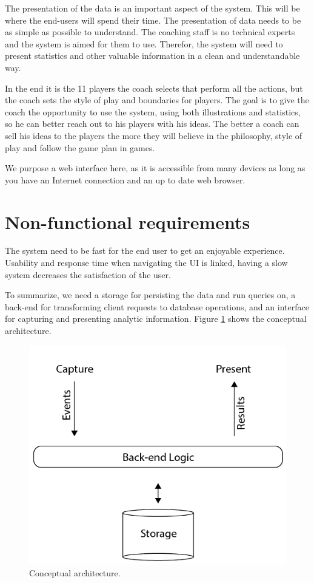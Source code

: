 The presentation of the data is an important aspect of the system. This will be where the end-users will spend their time. The presentation of data needs to be as simple as possible to understand. The coaching staff is no technical experts and the system is aimed for them to use. Therefor, the system will need to present statistics and other valuable information in a clean and understandable way. 

In the end it is the 11 players the coach selects that perform all the actions, but the coach sets the style of play and boundaries for players. The goal is to give the coach the opportunity to use the system, using both illustrations and statistics, so he can better reach out to his players with his ideas. The better a coach can sell his ideas to the players the more they will believe in the philosophy, style of play and follow the game plan in games.

We purpose a web interface here, as it is accessible from many devices as long as you have an Internet connection and an up to date web browser. 

\section{Non-functional requirements}

The system need to be fast for the end user to get an enjoyable experience. Usability and response time when navigating the \ac{UI} is linked, having a slow system decreases the satisfaction of the user.


To summarize, we need a storage for persisting the data and run queries on, a back-end for transforming client requests to database operations, and an interface for capturing and presenting analytic information. Figure \ref{fig:conept_arch} shows the conceptual architecture. 

\begin{figure}[ht!]
\centering
\includegraphics[width=150mm]{images/architecture/conceptual_architecture.png}
\caption{Conceptual architecture.}
\label{fig:conept_arch}
\end{figure}



